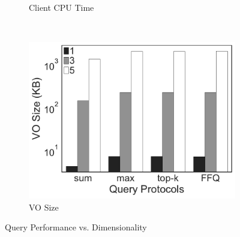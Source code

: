 \begin{figure}[t]
\begin{subfigure}[b]{.33\linewidth}
    \caption{Client CPU Time}
  \end{subfigure}~%
  \begin{subfigure}[b]{.33\linewidth}
    \centering
    \includegraphics[width=\linewidth]{exp-figs/aggregate-queries/dimension_vo.pdf}
    \caption{VO Size}
  \end{subfigure}
  \caption{Query Performance vs. Dimensionality}\label{fig:aggregate-queries:md}


\end{figure}
